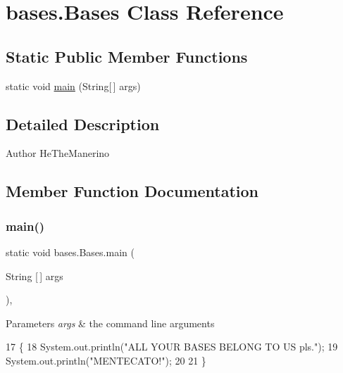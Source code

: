 \hypertarget{classbases_1_1_bases}{}\section{bases.\+Bases Class Reference}
\label{classbases_1_1_bases}
\subsection*{Static Public Member Functions}
\begin{DoxyCompactItemize}
\item 
static void \mbox{\hyperlink{classbases_1_1_bases_ae73d440c5dc1d647e434913d58dbe12d}{main}} (String\mbox{[}$\,$\mbox{]} args)
\end{DoxyCompactItemize}


\subsection{Detailed Description}
\begin{DoxyAuthor}{Author}
He\+The\+Manerino 
\end{DoxyAuthor}


\subsection{Member Function Documentation}
\mbox{\label{classbases_1_1_bases_ae73d440c5dc1d647e434913d58dbe12d}} 
\subsubsection{\texorpdfstring{main()}{main()}}
{\footnotesize\ttfamily static void bases.\+Bases.\+main (\begin{DoxyParamCaption}\item[{String \mbox{[}$\,$\mbox{]}}]{args }\end{DoxyParamCaption})\hspace{0.3cm}{\ttfamily [inline]}, {\ttfamily [static]}}


\begin{DoxyParams}{Parameters}
{\em args} & the command line arguments \\
\hline
\end{DoxyParams}

\begin{DoxyCode}
17                                            \{
18        System.out.println(\textcolor{stringliteral}{"ALL YOUR BASES BELONG TO US pls."});
19        System.out.println(\textcolor{stringliteral}{"MENTECATO!"});
20        
21     \}
\end{DoxyCode}
